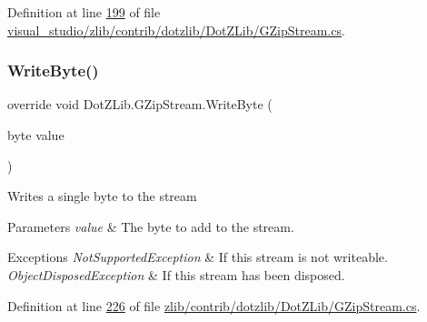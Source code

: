 Definition at line \hyperlink{visual__studio_2zlib_2contrib_2dotzlib_2_dot_z_lib_2_g_zip_stream_8cs_source_l00199}{199} of file \hyperlink{visual__studio_2zlib_2contrib_2dotzlib_2_dot_z_lib_2_g_zip_stream_8cs_source}{visual\+\_\+studio/zlib/contrib/dotzlib/\+Dot\+Z\+Lib/\+G\+Zip\+Stream.\+cs}.

\mbox{\label{class_dot_z_lib_1_1_g_zip_stream_a78b38035956f42bf1c66db34ec2ba2cc}} 
\subsubsection{\texorpdfstring{Write\+Byte()}{WriteByte()}\hspace{0.1cm}{\footnotesize\ttfamily [1/2]}}
{\footnotesize\ttfamily override void Dot\+Z\+Lib.\+G\+Zip\+Stream.\+Write\+Byte (\begin{DoxyParamCaption}\item[{byte}]{value }\end{DoxyParamCaption})\hspace{0.3cm}{\ttfamily [inline]}}



Writes a single byte to the stream 


\begin{DoxyParams}{Parameters}
{\em value} & The byte to add to the stream.\\
\hline
\end{DoxyParams}

\begin{DoxyExceptions}{Exceptions}
{\em Not\+Supported\+Exception} & If this stream is not writeable.\\
\hline
{\em Object\+Disposed\+Exception} & If this stream has been disposed.\\
\hline
\end{DoxyExceptions}


Definition at line \hyperlink{zlib_2contrib_2dotzlib_2_dot_z_lib_2_g_zip_stream_8cs_source_l00226}{226} of file \hyperlink{zlib_2contrib_2dotzlib_2_dot_z_lib_2_g_zip_stream_8cs_source}{zlib/contrib/dotzlib/\+Dot\+Z\+Lib/\+G\+Zip\+Stream.\+cs}.

\mbox{\label{class_dot_z_lib_1_1_g_zip_stream_a78b38035956f42bf1c66db34ec2ba2cc}} 
